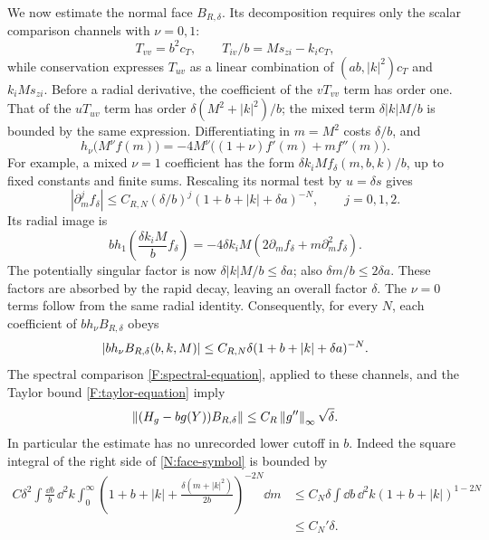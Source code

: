 We now estimate the normal face $B_{R,\delta}$.  Its decomposition
requires only the scalar comparison channels with $\nu=0,1$:
\[
 T_{vv}=b^2c_T,\qquad
 T_{iv}/b=M s_{zi}-k_i c_T,
\]
while conservation expresses $T_{uv}$ as a linear combination of
$(ab,|k|^2)c_T$ and $k_iM s_{zi}$.  Before a radial derivative, the
coefficient of the $vT_{vv}$ term has order one.  That of the
$uT_{uv}$ term has order $\delta(M^2+|k|^2)/b$; the mixed term
$\delta|k|M/b$ is bounded by the same expression.  Differentiating
in $m=M^2$ costs $\delta/b$, and
\begin{equation}\label{N:radial-identity}
 h_\nu\bigl(M^\nu f(m)\bigr)
 =-4M^\nu\bigl((1+\nu)f'(m)+mf''(m)\bigr).
\end{equation}
For example, a mixed $\nu=1$ coefficient has the form
$\delta k_iM f_\delta(m,b,k)/b$, up to fixed constants and finite sums.
Rescaling its normal test by $u=\delta s$ gives
\[
 |\partial_m^j f_\delta|
 \le C_{R,N}(\delta/b)^j
       (1+b+|k|+\delta a)^{-N},\qquad j=0,1,2.
\]
Its radial image is
\[
 b h_1\left(\frac{\delta k_iM}{b}f_\delta\right)
 =-4\delta k_iM\left(2\partial_m f_\delta
                              +m\partial_m^2 f_\delta\right).
\]
The potentially singular factor is now
$\delta |k|M/b\le\delta a$; also $\delta m/b\le2\delta a$.
These factors are absorbed by the rapid decay, leaving an overall
factor $\delta$. The $\nu=0$ terms follow from the same radial identity.
Consequently, for every $N$,
each coefficient of $bh_\nu B_{R,\delta}$ obeys
\begin{equation}\label{N:face-symbol}
 \left\lvert bh_\nu B_{R,\delta}(b,k,M)\right\rvert
 \leq C_{R,N}\delta
      (1+b+|k|+\delta a)^{-N}.
\end{equation}
The spectral comparison \eqref{F:spectral-equation}, applied to
these channels, and the Taylor bound \eqref{F:taylor-equation} imply
\begin{equation}\label{N:face-error}
 \left\lVert(H_g-bg(Y))B_{R,\delta}\right\rVert
 \leq C_R\left\lVert g''\right\rVert_\infty\sqrt\delta.
\end{equation}
In particular the estimate has no unrecorded lower cutoff in $b$.
Indeed the square integral of the right side of
\eqref{N:face-symbol} is bounded by
\begin{align*}
 C\delta^2\int\frac{\dd b}{b}\,\dd^2k
  \int_0^\infty
   \left(1+b+|k|+\frac{\delta(m+|k|^2)}{2b}\right)^{-2N}\dd m
 &\leq C_N\delta
       \int\dd b\,\dd^2k(1+b+|k|)^{1-2N}\\
 &\leq C_N'\delta.
\end{align*}

